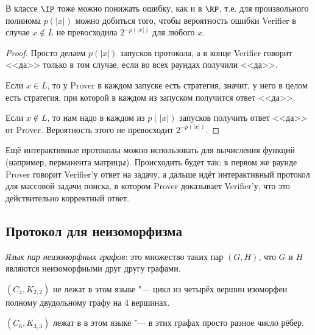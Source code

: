 	\begin{assertion}
		В классе $\IP$ тоже можно понижать ошибку, как и в $\RP$, т.е. для произвольного полинома $p(|x|)$ можно добиться того, чтобы
		вероятность ошибки Verifier в случае $x \notin L$ не превосходила $2^{-p(|x|)}$ для любого $x$.
	\end{assertion}
	\begin{proof}
		Просто делаем $p(|x|)$ запусков протокола, а в конце Verifier говорит <<да>> только в том случае, если во всех раундах получили <<да>>.

		Если $x \in L$, то у Prover в каждом запуске есть стратегия, значит, у него в целом есть стратегия, при которой в каждом из запуском получится ответ <<да>>.

		Если $x \notin L$, то нам надо в каждом из $p(|x|)$ запусков получить ответ <<да>> от Prover.
		Вероятность этого не превосходит $2^{-p(|x|)}$.
	\end{proof}
	\begin{Rem}
		Ещё интерактивные протоколы можно использовать для вычисления функций (например, перманента матрицы).
		Происходить будет так: в первом же раунде Prover говорит Verifier'у ответ на задачу, а дальше идёт интерактивный протокол
		для массовой задачи поиска, в котором Prover доказывает Verifier'у, что это действительно корректный ответ.
	\end{Rem}

\subsection{Протокол для неизоморфизма}
	\begin{Def}
		\textit{Язык пар неизоморфных графов}: это множество таких пар $(G, H)$, что $G$ и $H$ являются неизоморфными друг другу графами.
	\end{Def}
	\begin{exmp}
		$(C_4, K_{2,2})$ не лежат в этом языке "--- цикл из четырёх вершин изоморфен полному двудольному графу на 4 вершинах.
	\end{exmp}
	\begin{exmp}
		$(C_6, K_{3,3})$ лежат в в этом языке "--- в этих графах просто разное число рёбер.
	\end{exmp}

